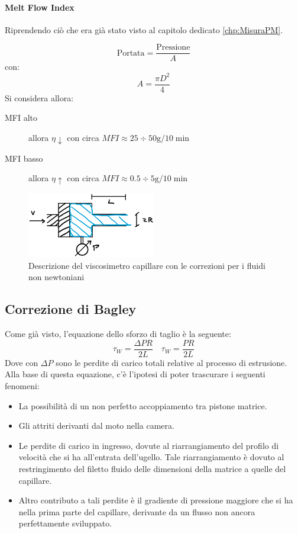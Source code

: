 \paragraph{Melt Flow Index}
Riprendendo ciò che era già stato visto al capitolo dedicato \ref{chp:MisuraPM}.

\begin{equation}
\text{Portata} = \frac{\text{Pressione}}{A}
\end{equation}
con:
\begin{equation}
A = \frac{\pi D^2}{4}
\end{equation}
Si considera allora:
\begin{description}
\item[MFI alto] allora $\eta \downarrow$ con circa
$MFI \approx 25 \div 50 \unit{\g/10\min}$
\item[MFI basso] allora $\eta \uparrow$ con circa
$MFI \approx 0.5 \div 5 \unit{\g/10\min}$
\end{description}

\begin{figure}
\centering
\includegraphics[width = 0.5\textwidth]{gfx/CorrezioneCapillare}
\caption{Descrizione del viscosimetro capillare con le correzioni per i fluidi non newtoniani}\label{fig:CorrezioneCapillare}
\end{figure}

\subsection{Correzione di Bagley}
Come già visto, l'equazione dello sforzo di taglio è la seguente:
\begin{equation}
\tau_W = \frac{\Delta P R}{2L} \quad \tau_W =\frac{PR}{2L}
\end{equation}
Dove con $\Delta P$ sono le perdite di carico totali relative al processo di estrusione.
Alla base di questa equazione, c'è l'ipotesi di poter trascurare i seguenti fenomeni:
\begin{itemize}
\item La possibilità di un non perfetto accoppiamento tra pistone matrice.
\item Gli attriti derivanti dal moto nella camera.
\item Le perdite di carico in ingresso, dovute al riarrangiamento del profilo di velocità che si ha all'entrata dell'ugello.
Tale riarrangiamento è dovuto al restringimento del filetto fluido delle dimensioni della matrice a quelle del capillare.
\item Altro contributo a tali perdite è il gradiente di pressione maggiore che si ha nella prima parte del capillare, derivante da un flusso non ancora perfettamente sviluppato.
\end{itemize}

